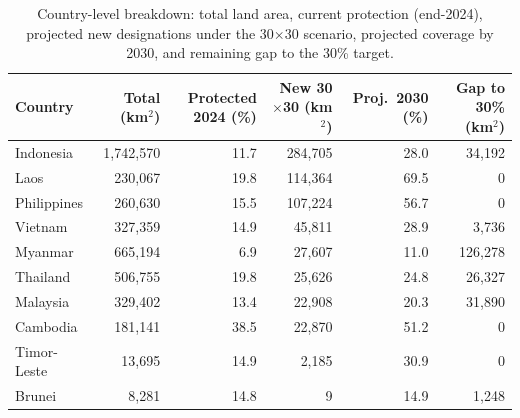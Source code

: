 \begin{table}[htbp]
  \centering
  \small
  \caption{Country-level breakdown: total land area, current protection (end-2024), projected new designations under the 30$\times$30 scenario, projected coverage by 2030, and remaining gap to the 30\% target.}
  \label{tab:forward_country}
  \begin{tabular}{lrrrrr}
    \toprule
    Country & Total (km$^2$) & Protected 2024 (\%) & New 30$\times$30 (km$^2$) & Proj.\ 2030 (\%) & Gap to 30\% (km$^2$) \\
    \midrule
    Indonesia & 1,742,570 & 11.7 & 284,705 & 28.0 & 34,192 \\
    Laos & 230,067 & 19.8 & 114,364 & 69.5 & 0 \\
    Philippines & 260,630 & 15.5 & 107,224 & 56.7 & 0 \\
    Vietnam & 327,359 & 14.9 & 45,811 & 28.9 & 3,736 \\
    Myanmar & 665,194 & 6.9 & 27,607 & 11.0 & 126,278 \\
    Thailand & 506,755 & 19.8 & 25,626 & 24.8 & 26,327 \\
    Malaysia & 329,402 & 13.4 & 22,908 & 20.3 & 31,890 \\
    Cambodia & 181,141 & 38.5 & 22,870 & 51.2 & 0 \\
    Timor-Leste & 13,695 & 14.9 & 2,185 & 30.9 & 0 \\
    Brunei & 8,281 & 14.8 & 9 & 14.9 & 1,248 \\
    \bottomrule
  \end{tabular}
\end{table}
